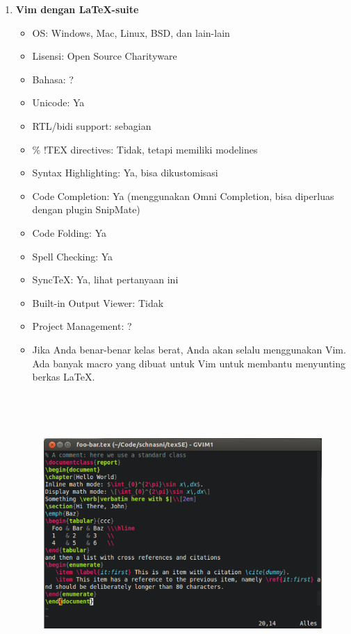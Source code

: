 \documentclass[12pt,a4paper]{article}
\begin{document}
\begin{enumerate}
\item \textbf{Vim dengan LaTeX-suite}
\begin{itemize}
\item OS: Windows, Mac, Linux, BSD, dan lain-lain
\item Lisensi: Open Source Charityware
\item Bahasa: ?
\item Unicode: Ya
\item RTL/bidi support: sebagian
\item \% !TEX directives: Tidak, tetapi memiliki modelines
\item Syntax Highlighting: Ya, bisa dikustomisasi
\item Code Completion: Ya (menggunakan Omni Completion, bisa diperluas dengan plugin SnipMate)
\item Code Folding: Ya
\item Spell Checking: Ya
\item SyncTeX: Ya, lihat pertanyaan ini
\item Built-in Output Viewer: Tidak
\item Project Management: ?
\item Jika Anda benar-benar kelas berat, Anda akan selalu menggunakan Vim. Ada banyak macro yang dibuat untuk Vim untuk membantu menyunting berkas LaTeX.
\end{itemize}
\begin{figure}[ht]
\centering
\includegraphics[width=15.57cm,height=10.66cm]{gambar/image4.jpg}
\end{figure}


\end{enumerate}
\end{document}

